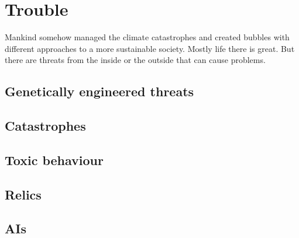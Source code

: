\chapter{Trouble}

Mankind somehow managed the climate catastrophes and created bubbles with different approaches to a more sustainable society. Mostly life there is great. But there are threats from the inside or the outside that can cause problems.

\section{Genetically engineered threats}

\section{Catastrophes}

\section{Toxic behaviour}

\section{Relics}

\section{AIs}

